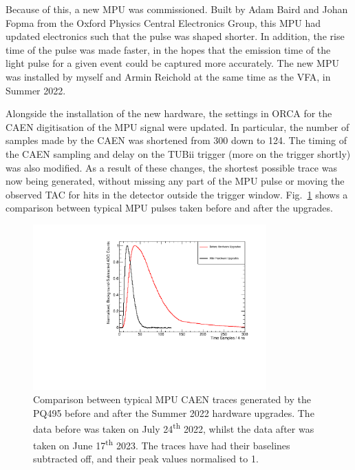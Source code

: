 Because of this, a new MPU was commissioned. Built by Adam Baird and Johan Fopma from the Oxford Physics Central Electronics Group, this MPU had updated electronics such that the pulse was shaped shorter. In addition, the rise time of the pulse was made faster, in the hopes that the emission time of the light pulse for a given event could be captured more accurately. The new MPU was installed by myself and Armin Reichold at the same time as the VFA, in Summer 2022.

Alongside the installation of the new hardware, the settings in ORCA for the CAEN digitisation of the MPU signal were updated. In particular, the number of samples made by the CAEN was shortened from 300 down to 124. The timing of the CAEN sampling and delay on the TUBii trigger (more on the trigger shortly) was also modified. As a result of these changes, the shortest possible trace was now being generated, without missing any part of the MPU pulse or moving the observed TAC for hits in the detector outside the trigger window. Fig.~\ref{fig:caen_trace_comparison} shows a comparison between typical MPU pulses taken before and after the upgrades.

\begin{figure}
    \centering
    \includegraphics[width=0.8\textwidth]{3_SMELLIEHardware/images/caen_traces_comparison_plot.pdf}
    \caption[Comparison between typical MPU CAEN traces generated by the PQ495 before and after the Summer 2022 hardware upgrades]
    {Comparison between typical MPU CAEN traces generated by the PQ495 before and after the Summer 2022 hardware upgrades. The data before was taken on July 24\textsuperscript{th} 2022, whilst the data after was taken on June 17\textsuperscript{th} 2023. The traces have had their baselines subtracted off, and their peak values normalised to 1.}
    \label{fig:caen_trace_comparison}
\end{figure}

